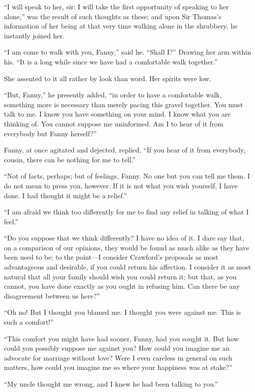 ``I will speak to her, sir:  I will take the first opportunity
of speaking to her alone,'' was the result of such thoughts
as these; and upon Sir Thomas's information of her
being at that very time walking alone in the shrubbery,
he instantly joined her.

``I am come to walk with you, Fanny,'' said he.  ``Shall I?''
Drawing her arm within his.  ``It is a long while since we
have had a comfortable walk together.''

She assented to it all rather by look than word.
Her spirits were low.

``But, Fanny,'' he presently added, ``in order to have a
comfortable walk, something more is necessary than merely
pacing this gravel together.  You must talk to me.
I know you have something on your mind.  I know what you
are thinking of.  You cannot suppose me uninformed.
Am I to hear of it from everybody but Fanny herself?''

Fanny, at once agitated and dejected, replied, ``If you
hear of it from everybody, cousin, there can be nothing
for me to tell.''

``Not of facts, perhaps; but of feelings, Fanny.
No one but you can tell me them.  I do not mean to
press you, however.  If it is not what you wish yourself,
I have done.  I had thought it might be a relief.''

``I am afraid we think too differently for me to find
any relief in talking of what I feel.''

``Do you suppose that we think differently?  I have no idea
of it.  I dare say that, on a comparison of our opinions,
they would be found as much alike as they have been used to be:
to the point---I consider Crawford's proposals as most
advantageous and desirable, if you could return his affection.
I consider it as most natural that all your family
should wish you could return it; but that, as you cannot,
you have done exactly as you ought in refusing him.
Can there be any disagreement between us here?''

``Oh no!  But I thought you blamed me.  I thought you
were against me.  This is such a comfort!''

``This comfort you might have had sooner, Fanny, had you
sought it.  But how could you possibly suppose me against you?
How could you imagine me an advocate for marriage without love?
Were I even careless in general on such matters, how could
you imagine me so where your happiness was at stake?''

``My uncle thought me wrong, and I knew he had been talking
to you.''

